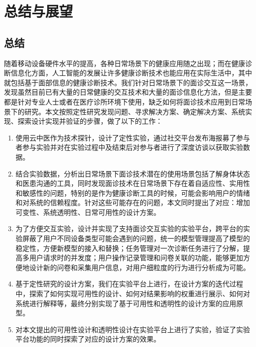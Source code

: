 \chapter{总结与展望}
\section{总结}
随着移动设备硬件水平的提高，各种日常场景下的健康应用随之出现；而在健康诊断信息化方面，人工智能的发展让许多健康诊断技术也能应用在实际生活中，其中就包括基于面部信息的健康诊断技术。我们针对日常场景下的面诊交互这一场景，发现虽然目前已有大量的日常健康的交互技术和大量的面诊信息化方法，但是主要都是针对专业人士或者在医疗诊所环境下使用，缺乏如何将面诊技术应用到日常场景下的研究。本文按照定性研究发现问题、寻求解决方案、确定解决方案、系统实现、探索设计实现并验证的步骤，做了以下的工作：

\begin{enumerate}
	\item 使用云中医作为技术探针，设计了定性实验，通过社交平台发布海报募了参与者参与实验并对在实验过程中及结束后对参与者进行了深度访谈以获取实验数据。
	
	\item 结合实验数据，分析出日常场景下面诊技术潜在的使用场景包括了解身体状态和医患沟通的工具，同时发现面诊技术在日常场景下存在着自适应性、实用性和敏感性的问题，特别的是作为健康诊断工具的时候，可能会影响用户的情绪和对系统的信赖程度。针对这些可能存在的问题，本文同时提出了对应：增加可变性、系统透明性、日常可用性的设计方案。

	\item 为了方便交互实验，设计并实现了支持面诊交互实验的实验平台，跨平台的实验屏蔽了用户不同设备类型可能会遇到的问题，统一的模型管理提高了模型的稳定性，方便新模型的接入和替换；任务管理对一次诊断任务进行了分解，提高多用户请求时的并发度；用户操作记录管理和问卷关联的功能，能够更加方便地设计新的问卷和采集用户信息，对用户细粒度的行为进行分析成为可能。
	
	\item 基于定性研究的设计方案，我们在实验平台上进行，在设计方案的迭代过程中，探索了如何实现可用性的设计、如何对结果影响的权重进行展示、如何对系统进行解释等，最终分别实现了基于可用性和透明性的设计方案的应用原型。

	\item 对本文提出的可用性设计和透明性设计在实验平台上进行了实验，验证了实验平台功能的同时探索了对应的设计方案的效果。
\end{enumerate}




